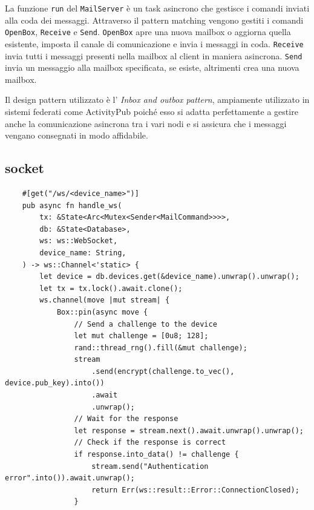 La funzione \texttt{run} del \texttt{MailServer} è un task asincrono che gestisce i comandi inviati alla coda dei messaggi.
Attraverso il pattern matching vengono gestiti i comandi \texttt{OpenBox}, \texttt{Receive} e \texttt{Send}.
\texttt{OpenBox} apre una nuova mailbox o aggiorna quella esistente, imposta il canale di comunicazione e invia i messaggi in coda.
\texttt{Receive} invia tutti i messaggi presenti nella mailbox al client in maniera asincrona.
\texttt{Send} invia un messaggio alla mailbox specificata, se esiste, altrimenti crea una nuova mailbox.

Il design pattern utilizzato è l' \textit{Inbox and outbox pattern}, ampiamente utilizzato in sistemi 
federati come ActivityPub poiché esso si adatta perfettamente a gestire anche la comunicazione
asincrona tra i vari nodi e si assicura che i messaggi vengano consegnati in modo affidabile.

\subsection{socket}

\begin{listing}[H]
    \begin{verbatim}
    #[get("/ws/<device_name>")]
    pub async fn handle_ws(
        tx: &State<Arc<Mutex<Sender<MailCommand>>>>,
        db: &State<Database>,
        ws: ws::WebSocket,
        device_name: String,
    ) -> ws::Channel<'static> {
        let device = db.devices.get(&device_name).unwrap().unwrap();
        let tx = tx.lock().await.clone();
        ws.channel(move |mut stream| {
            Box::pin(async move {
                // Send a challenge to the device
                let mut challenge = [0u8; 128];
                rand::thread_rng().fill(&mut challenge);
                stream
                    .send(encrypt(challenge.to_vec(), device.pub_key).into())
                    .await
                    .unwrap();
                // Wait for the response
                let response = stream.next().await.unwrap().unwrap();
                // Check if the response is correct
                if response.into_data() != challenge {
                    stream.send("Authentication error".into()).await.unwrap();
                    return Err(ws::result::Error::ConnectionClosed);
                }
    \end{verbatim}
\end{listing}

